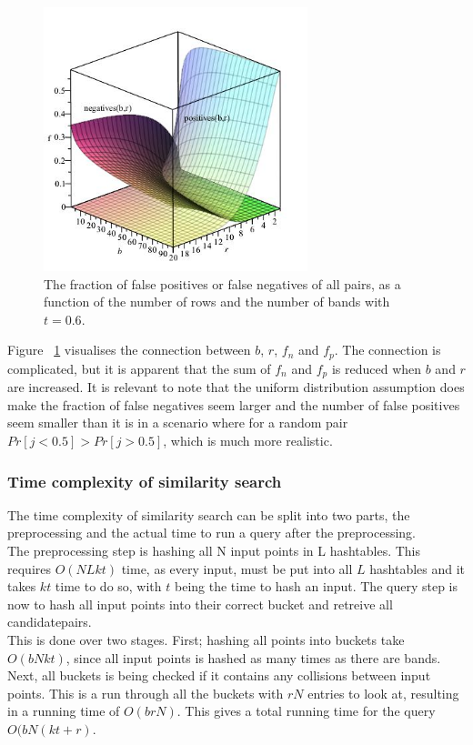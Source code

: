 \begin{figure}[H]
	\centering
	\includegraphics[width=290px]{img/falseGraph.jpg}
	\caption{The fraction of false positives or false negatives of all pairs, as a function of the number of rows and the number of bands with \(t=0.6\).}
	\label{fig:false_graph}
\end{figure}

Figure ~\ref{fig:false_graph} visualises the connection between \(b\), \(r\), \(f_n\) and \(f_p\). The connection is complicated, but it is apparent that the sum of \(f_n\) and \(f_p\) is reduced when \(b\) and \(r\) are increased. It is relevant to note that the uniform distribution assumption does make the fraction of false negatives seem larger and the number of false positives seem smaller than it is in a scenario where for a random pair \(Pr[j<0.5] > Pr[j>0.5]\), which is much more realistic.

\subsubsection{Time complexity of similarity search}
The time complexity of similarity search can be split into two parts, the preprocessing and the actual time to run a query after the preprocessing.\\
The preprocessing step is hashing all N input points in L hashtables. This requires \(O(NLkt)\) time, as every input, must be put into all \(L\) hashtables and it takes \(kt\) time to do so, with \(t\) being the time to hash an input. The query step is 
now to hash all input points into their correct bucket and retreive all candidatepairs. \\
This is done over two stages. First; hashing all points into buckets take \(O(bNkt)\), since all input points is hashed as many times as there are bands. Next, all buckets is being checked if it contains any collisions between input points. This is a run through all the buckets with \(rN\) entries to look at, resulting in a running time of \(O(brN)\). This gives a total running time for the query \(O(bN(kt+r)\).

